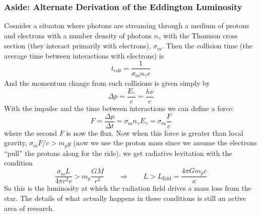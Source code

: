 \documentclass[10pt]{article}
\numberwithin{equation}{section}
\begin{document}
	\subsubsection{Aside: Alternate Derivation of the Eddington Luminosity} %
	\label{ssub:alternate_derivation_of_the_eddington_luminosity}
		Cosnider a situaton where photons are streaming through a medium of protons
		and electrons with a number density of photons $n_\gamma$ with the Thomson
		cross section (they interact primarily with electrons),
		$\sigma_{\mathrm{es}}$. Then the collision time (the average time between
		interactions with electrons) is
		\begin{equation}
			\label{eq:tcollision} t_{\mathrm{coll}} =
			\frac{1}{\sigma_{\mathrm{es}}n_\gamma c}
		\end{equation}
		And the momentum change from such collisions is given simply by
		\begin{equation}
			\label{eq:ledd:1} \Delta p = \frac{E_\gamma}{c}=\frac{h\nu}{c}
		\end{equation}
		With the impulse and the time between interactions we can define a force:
		\begin{equation}
			\label{eq:ledd:2} F=\frac{\Delta p}{\Delta t} =
			\sigma_{\mathrm{es}}n_\gamma E_\gamma = \sigma_{\mathrm{es}} \frac{F}{c}
		\end{equation}
		where the second $F$ is now the flux. Now when this force is greater than
		local gravity, $\sigma_{\mathrm{es}} F/c > m_p g$ (now we use the proton
		mass since we assume the electrons ``pull'' the protons along for the ride),
		we get radiative levitation with the condition
		\begin{equation}
			\label{eq:ledd:3} \frac{\sigma_{\mathrm{es}}L}{4\pi r^2 c} > m_p \frac{G
			M}{r^2} \qquad \Rightarrow \qquad L > L_{\mathrm{Edd}} = \frac{4\pi G m_p
			c}{\kappa}
		\end{equation}
		So this is the luminosity at which the radiation field drives a mass loss
		from the star. The details of what actually happens in these conditions is
		still an active area of research.
\end{document}

